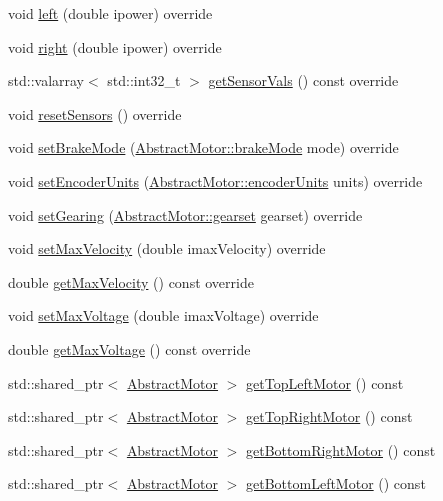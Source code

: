 \begin{DoxyCompactItemize}
\item 
void \mbox{\hyperlink{classokapi_1_1XDriveModel_a0a4688df022b66164e81709e6eaa02e5}{left}} (double ipower) override
\item 
void \mbox{\hyperlink{classokapi_1_1XDriveModel_a21bc8f93cda3b0b58ec6543a6dc02c24}{right}} (double ipower) override
\item 
std\+::valarray$<$ std\+::int32\+\_\+t $>$ \mbox{\hyperlink{classokapi_1_1XDriveModel_a3beef170f1e7fd988d815f335cafad1e}{get\+Sensor\+Vals}} () const override
\item 
void \mbox{\hyperlink{classokapi_1_1XDriveModel_adbc23b11cde6aebb3c7eefb1f0251af7}{reset\+Sensors}} () override
\item 
void \mbox{\hyperlink{classokapi_1_1XDriveModel_a27356e54c9fd0361d01de4c81ff851e7}{set\+Brake\+Mode}} (\mbox{\hyperlink{classokapi_1_1AbstractMotor_a132e0485dbb59a60c3f934338d8fa601}{Abstract\+Motor\+::brake\+Mode}} mode) override
\item 
void \mbox{\hyperlink{classokapi_1_1XDriveModel_a56b590280c856259ad710e888d8e215c}{set\+Encoder\+Units}} (\mbox{\hyperlink{classokapi_1_1AbstractMotor_ae811cd825099f2defadeb1b7f7e7764c}{Abstract\+Motor\+::encoder\+Units}} units) override
\item 
void \mbox{\hyperlink{classokapi_1_1XDriveModel_ae9205c16e581786fecabaeb5066edab6}{set\+Gearing}} (\mbox{\hyperlink{classokapi_1_1AbstractMotor_a88aaa6ea2fa10f5520a537bbf26774d5}{Abstract\+Motor\+::gearset}} gearset) override
\item 
void \mbox{\hyperlink{classokapi_1_1XDriveModel_aec91f0569213bbca770ad4a25529beb6}{set\+Max\+Velocity}} (double imax\+Velocity) override
\item 
double \mbox{\hyperlink{classokapi_1_1XDriveModel_aa5b5c3431c99c612ade5c97858478828}{get\+Max\+Velocity}} () const override
\item 
void \mbox{\hyperlink{classokapi_1_1XDriveModel_a6d001a2147ecb642f60cd21ac73c64ea}{set\+Max\+Voltage}} (double imax\+Voltage) override
\item 
double \mbox{\hyperlink{classokapi_1_1XDriveModel_a402487e35a717c47cfcc85ad1cfb0861}{get\+Max\+Voltage}} () const override
\item 
std\+::shared\+\_\+ptr$<$ \mbox{\hyperlink{classokapi_1_1AbstractMotor}{Abstract\+Motor}} $>$ \mbox{\hyperlink{classokapi_1_1XDriveModel_a6ffd50946ef2655b3d8c74c0d211101b}{get\+Top\+Left\+Motor}} () const
\item 
std\+::shared\+\_\+ptr$<$ \mbox{\hyperlink{classokapi_1_1AbstractMotor}{Abstract\+Motor}} $>$ \mbox{\hyperlink{classokapi_1_1XDriveModel_abd08edca41aa963c15fafc4b735c0e8d}{get\+Top\+Right\+Motor}} () const
\item 
std\+::shared\+\_\+ptr$<$ \mbox{\hyperlink{classokapi_1_1AbstractMotor}{Abstract\+Motor}} $>$ \mbox{\hyperlink{classokapi_1_1XDriveModel_aa7305b4d70feaf3d7201c4b60f29b289}{get\+Bottom\+Right\+Motor}} () const
\item 
std\+::shared\+\_\+ptr$<$ \mbox{\hyperlink{classokapi_1_1AbstractMotor}{Abstract\+Motor}} $>$ \mbox{\hyperlink{classokapi_1_1XDriveModel_a9d009ced4cfce5d1ba9ac2c4ad67212a}{get\+Bottom\+Left\+Motor}} () const
\end{DoxyCompactItemize}
